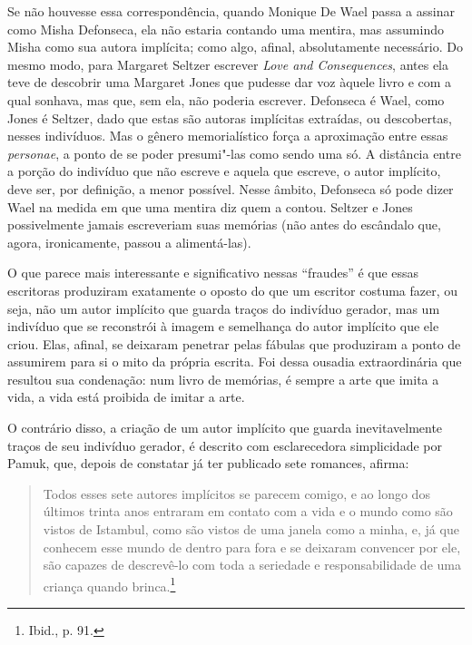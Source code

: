 Se não houvesse essa correspondência, quando Monique De Wael passa a
assinar como Misha Defonseca, ela não estaria contando uma mentira, mas
assumindo Misha como sua autora implícita; como algo, afinal,
absolutamente necessário. Do mesmo modo, para Margaret Seltzer escrever
\emph{Love and Consequences}, antes ela teve de descobrir uma Margaret
Jones que pudesse dar voz àquele livro e com a qual sonhava, mas que,
sem ela, não poderia escrever. Defonseca é Wael, como Jones é Seltzer, dado que estas são autoras implícitas extraídas, ou descobertas, nesses
indivíduos. Mas o gênero memorialístico força a aproximação entre essas
\emph{personae}, a ponto de se poder presumi"-las como sendo uma só. A
distância entre a porção do indivíduo que não escreve e aquela que
escreve, o autor implícito, deve ser, por definição, a menor possível.
Nesse âmbito, Defonseca só pode dizer Wael na medida em que uma mentira
diz quem a contou. Seltzer e Jones possivelmente jamais escreveriam suas
memórias (não antes do escândalo que, agora, ironicamente, passou a
alimentá-las).

O que parece mais interessante e significativo nessas ``fraudes'' é que
essas escritoras produziram exatamente o oposto do que um escritor
costuma fazer, ou seja, não um autor implícito que guarda traços do
indivíduo gerador, mas um indivíduo que se reconstrói à imagem e
semelhança do autor implícito que ele criou. Elas, afinal, se deixaram
penetrar pelas fábulas que produziram a ponto de assumirem para si o
mito da própria escrita. Foi dessa ousadia extraordinária que resultou
sua condenação: num livro de memórias, é sempre a arte que imita a vida,
a vida está proibida de imitar a arte.

O contrário disso, a criação de um autor implícito que guarda
inevitavelmente traços de seu indivíduo gerador, é descrito com
esclarecedora simplicidade por Pamuk, que, depois de constatar já ter
publicado sete romances, afirma:

\begin{quote}
Todos esses sete autores implícitos se parecem comigo, e ao longo dos
últimos trinta anos entraram em contato com a vida e o mundo como são
vistos de Istambul, como são vistos de uma janela como a minha, e, já
que conhecem esse mundo de dentro para fora e se deixaram convencer por
ele, são capazes de descrevê-lo com toda a seriedade e responsabilidade
de uma criança quando brinca.\footnote{Ibid., p. 91.}
\end{quote}

